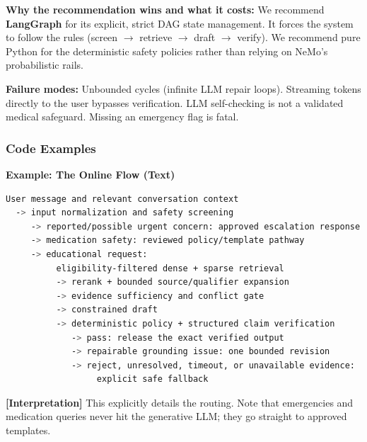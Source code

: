\documentclass[11pt,a4paper]{article}
\newcommand{\origintag}[2]{\textcolor{#1}{\small\textbf{[#2]}}}
\begin{document}
\textbf{Why the recommendation wins and what it costs:} We recommend \textbf{LangGraph} for its explicit, strict DAG state management. It forces the system to follow the rules (screen $\rightarrow$ retrieve $\rightarrow$ draft $\rightarrow$ verify). We recommend pure Python for the deterministic safety policies rather than relying on NeMo's probabilistic rails.

\textbf{Failure modes:} Unbounded cycles (infinite LLM repair loops). Streaming tokens directly to the user bypasses verification. LLM self-checking is not a validated medical safeguard. Missing an emergency flag is fatal.

\subsubsection{Code Examples}

\textbf{Example: The Online Flow (Text)}
\begin{lstlisting}[language=bash]
User message and relevant conversation context
  -> input normalization and safety screening
     -> reported/possible urgent concern: approved escalation response
     -> medication safety: reviewed policy/template pathway
     -> educational request:
          eligibility-filtered dense + sparse retrieval
          -> rerank + bounded source/qualifier expansion
          -> evidence sufficiency and conflict gate
          -> constrained draft
          -> deterministic policy + structured claim verification
             -> pass: release the exact verified output
             -> repairable grounding issue: one bounded revision
             -> reject, unresolved, timeout, or unavailable evidence:
                  explicit safe fallback
\end{lstlisting}
\origintag{slate}{Interpretation} This explicitly details the routing. Note that emergencies and medication queries never hit the generative LLM; they go straight to approved templates. 
\end{document}
